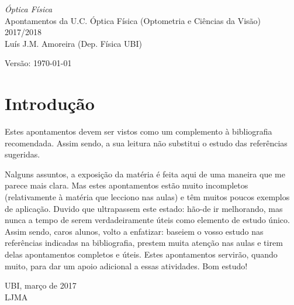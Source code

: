 \begin{titlepage}
\noindent
{\Huge\sffamily\textsl{Óptica Física}}\\[10mm]
{\Large\textsf{Apontamentos da U.C. Óptica Física
(Optometria e Ciências da Visão)}}\\[5mm]
{\Large\textsf 2017/2018}\\[15mm]
{\large\textsf{Luís J.M. Amoreira (Dep. Física UBI)}}

\vspace{35mm}
\noindent
{\small \textsf{Versão: \today}}
\vfill
\begin{center}
\end{center}
\vfill
\end{titlepage}
\thispagestyle{plain}
\section*{Introdução}
Estes apontamentos devem ser vistos como um complemento à bibliografia
recomendada. Assim sendo, a sua leitura não substitui o estudo das 
referências sugeridas.

\noindent
Nalguns assuntos, a exposição da matéria é feita aqui de uma maneira que me
parece mais clara. Mas estes apontamentos estão muito incompletos (relativamente
à matéria que lecciono nas aulas) e têm muitos poucos exemplos de aplicação.
Duvido que ultrapassem este estado: hão-de ir melhorando, mas nunca a tempo de
serem verdadeiramente úteis como elemento de estudo único. Assim sendo, caros
alunos, volto a enfatizar: baseiem o vosso estudo nas referências indicadas na
bibliografia, prestem muita atenção nas aulas e tirem delas apontamentos
completos e úteis. Estes apontamentos servirão, quando muito, para dar um apoio
adicional a essas atividades. 
\noindent
Bom estudo!

\vspace{2cm}
\hfill
\begin{minipage}{0.4\linewidth}
UBI, março de 2017\\
LJMA
\end{minipage}

\vspace{3cm}

